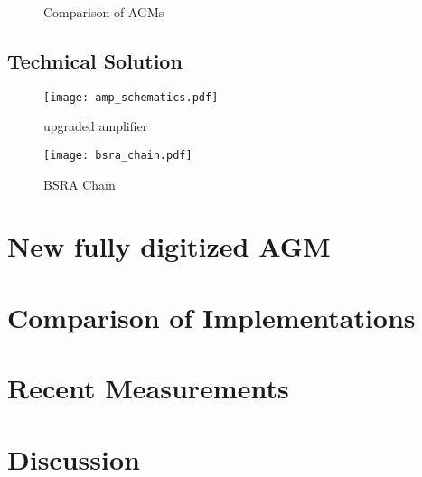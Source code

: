 
    \begin{figure}[!htb]
      \begin{center}
          \scalebox{0.54}{}
          \caption{Comparison of AGMs}
          \label{fig:comparison_chart}
      \end{center}
    \end{figure}


    \subsection{Technical Solution}
        \begin{figure*}[!tbh]
            \centering
            \texttt{[image: amp\_schematics.pdf]}
            \caption{upgraded amplifier}
            \label{fig:amplifier}
        \end{figure*}

        \begin{figure*}[!tbh]
            \centering
            \texttt{[image: bsra\_chain.pdf]}
            \caption{BSRA Chain}
            \label{fig:bsra_chain}
        \end{figure*}

\section{New fully digitized AGM}

\section{Comparison of Implementations}

\section{Recent Measurements}

\section{Discussion}
